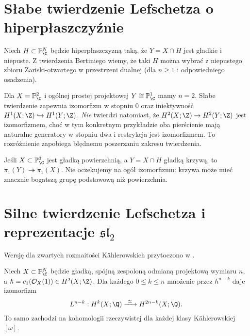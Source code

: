 \section{Słabe twierdzenie Lefschetza o hiperpłaszczyźnie}
Niech $H\subset\mathbb P^N_\C$ będzie hiperpłaszczyzną taką,
że $Y=X\cap H$ jest gładkie i niepuste. Z twierdzenia Bertiniego
wiemy, że taki $H$ można wybrać z niepustego zbioru Zariski-otwartego
w przestrzeni dualnej (dla $n\ge1$ i odpowiedniego osadzenia).



\begin{przyklad}
Dla $X=\mathbb P^2_\C$ i ogólnej prostej projektowej
$Y\cong\mathbb P^1_\C$ mamy $n=2$.
Słabe twierdzenie zapewnia izomorfizm w stopniu $0$ oraz
iniektywność $H^1(X;\Z)\hookrightarrow H^1(Y;\Z)$.
\emph{Nie} twierdzi natomiast, że $H^2(X;\Z)\to H^2(Y;\Z)$
jest izomorfizmem, choć w tym konkretnym przykładzie oba
pierścienie mają naturalne generatory w stopniu dwa i restrykcja
jest izomorfizmem. To rozróżnienie zapobiega błędnemu
poszerzaniu zakresu twierdzenia.
\end{przyklad}

\begin{przyklad}
Jeśli $X\subset\mathbb P^3_\C$ jest gładką powierzchnią,
a $Y=X\cap H$ gładką krzywą, to $\pi_1(Y)\twoheadrightarrow\pi_1(X)$.
Nie oczekujemy na ogół izomorfizmu: krzywa może mieć
znacznie bogatszą grupę podstawową niż powierzchnia.
\end{przyklad}

\section{Silne twierdzenie Lefschetza i reprezentacje $\mathfrak{sl}_2$}
Wersję dla zwartych rozmaitości Kählerowskich przytoczono w .

\begin{twierdzenie}
\label{thm:xvii-hard-lefschetz}
Niech $X\subset\mathbb P^N_\C$ będzie gładką,
spójną zespoloną odmianą projektową
wymiaru $n$, a $h=c_1(\mathcal O_X(1))\in H^2(X;\Z)$.
Dla każdego $0\le k\le n$ mnożenie przez $h^{n-k}$ daje izomorfizm
\[
L^{n-k}:H^k(X;\Q)\xrightarrow{\ \simeq\ }H^{2n-k}(X;\Q).
\]
To samo zachodzi na kohomologii rzeczywistej dla każdej
klasy Kählerowskiej $[\omega]$.
\end{twierdzenie}


